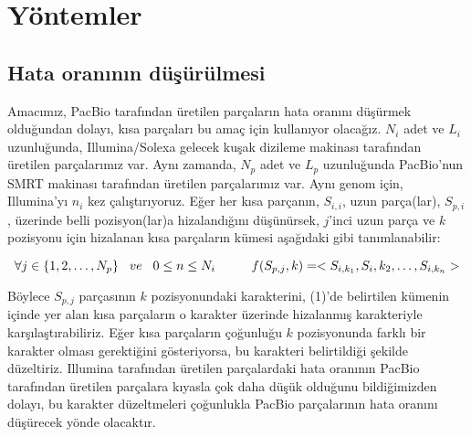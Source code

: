 \section{Yöntemler}
\subsection{Hata oranının düşürülmesi}
Amacımız, PacBio tarafından üretilen parçaların hata oranını düşürmek olduğundan dolayı, kısa parçaları bu amaç için kullanıyor olacağız. $N_i$ adet ve $L_i$ uzunluğunda, Illumina/Solexa gelecek kuşak dizileme makinası tarafından üretilen parçalarımız var. Aynı zamanda, $N_p$ adet ve $L_p$ uzunluğunda PacBio'nun SMRT makinası tarafından üretilen parçalarımız var. Aynı genom için, Illumina'yı $n_i$ kez çalıştırıyoruz. Eğer her kısa parçanın, $S_{i,i}$, uzun parça(lar), $S_{p,i}$, üzerinde belli pozisyon(lar)a hizalandığını düşünürsek, $j$'inci uzun parça ve $k$ pozisyonu için hizalanan kısa parçaların kümesi aşağıdaki gibi tanımlanabilir:

\begin{equation} \label{eq1}
\forall j \in \{1,2, \dots, N_p\} \hspace{0.3cm} ve \hspace{0.3cm}  0 \leq n \leq N_i \hspace{1cm}  f(S_{p,j}, k) = < S_{i,k_1},  S_i,k_2 , \dots, S_{i,k_n} >
\end{equation}

Böylece $S_{p,j}$ parçasının $k$ pozisyonundaki karakterini, (1)'de belirtilen kümenin içinde yer alan kısa parçaların o karakter üzerinde hizalanmış karakteriyle karşılaştırabiliriz. Eğer kısa parçaların çoğunluğu $k$ pozisyonunda farklı bir karakter olması gerektiğini gösteriyorsa, bu karakteri belirtildiği şekilde düzeltiriz. Illumina tarafından üretilen parçalardaki hata oranının PacBio tarafından üretilen parçalara kıyasla çok daha düşük olduğunu bildiğimizden dolayı, bu karakter düzeltmeleri çoğunlukla PacBio parçalarının hata oranını düşürecek yönde olacaktır.

